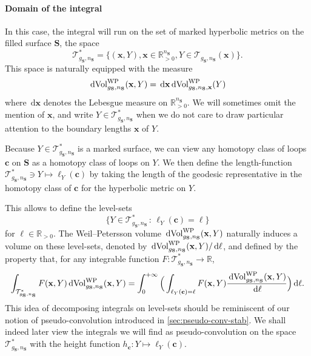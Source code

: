 \documentclass[12pt,twoside]{article}
\theoremstyle{theorem}
\theoremstyle{remark}
\theoremstyle{definition}
\theoremstyle{example}
\newcommand{\R}{\mathbb{R}}
\renewcommand{\d}{\, \mathrm{d}}
\newcommand{\x}{\mathbf{x}}
\newcommand{\1}[1]{\mathds{1}_{#1}}
\newcommand{\cT}{\mathcal{T}}
\newcommand{\Sf}{\mathbf{S}}
\newcommand{\g}{g_{\mathbf{S}}}
\newcommand{\n}{n_{\mathbf{S}}}
\newcommand{\Volwp}[1][g]{\mathrm{Vol}_{#1}^{\mathrm{\scriptsize{WP}}}}
\newcommand{\curve}{\mathbf{c}}
\begin{document}
\paragraph{Domain of the integral}

In this case, the integral will run on the set of marked hyperbolic metrics on the filled surface
$\Sf$, the space
\begin{equation}
  \label{eq:def_teich}
  \cT^*_{\g,\n} = \{(\x, Y), \x \in \R_{>0}^{\n}, Y \in \cT_{\g,\n}(\x)\}.
\end{equation}
This space is naturally equipped with the measure
\begin{equation}
  \label{eq:vol_teich}
  \d \Volwp[\g,\n](\x,Y) = \d \x \d \Volwp[\g,\n,\x](Y)
\end{equation}
where $\d \x$ denotes the Lebesgue measure on $\R_{>0}^{\n}$. We will sometimes omit the mention of
$\x$, and write $Y \in \cT_{\g,\n}^*$ when we do not care to draw particular attention to the
boundary lengths $\x$ of $Y$.

Because $Y \in \cT_{\g,\n}^*$ is a marked surface, we can view any homotopy class of loops $\curve$
on $\Sf$ as a homotopy class of loops on $Y$. We then define the length-function
$\cT_{\g,\n}^* \ni Y \mapsto \ell_Y(\mathbf{c})$ by taking the length of the geodesic representative
in the homotopy class of  $\mathbf{c}$ for the hyperbolic metric on $Y$.

This allows to define the level-sets
\begin{equation}
  \label{eq:level-set}
  \{Y \in \cT_{\g,\n}^* \, : \, \ell_Y(\curve) = \ell\}
\end{equation}
for $\ell \in \R_{>0}$. The Weil--Petersson volume $\d \Volwp[\g,\n](\x,Y)$ naturally induces a volume on
these level-sets, denoted by $\d \Volwp[\g,\n](\x,Y)/\d \ell$, and defined by the property that, for
any integrable function $F : \cT_{\g,\n}^* \rightarrow \R$,
\begin{equation*}
  \int_{\cT_{\g,\n}^*} F(\x,Y) \d  \Volwp[\g,\n](\x,Y)
  = \int_0^{+ \infty} \Big(\int_{\ell_Y(\curve)=\ell} F(\x,Y) \frac{\d \Volwp[\g,\n](\x,Y)}{\d \ell} \Big)\d \ell.
\end{equation*}
This idea of decomposing integrals on level-sets should be reminiscent of our notion of
pseudo-convolution introduced in \cref{sec:pseudo-conv-stab}. We shall indeed later view the
integrals we will find as pseudo-convolution on the space $\cT_{\g,\n}^*$ with the height function
$h_\curve: Y \mapsto \ell_Y(\curve)$.
\end{document}
